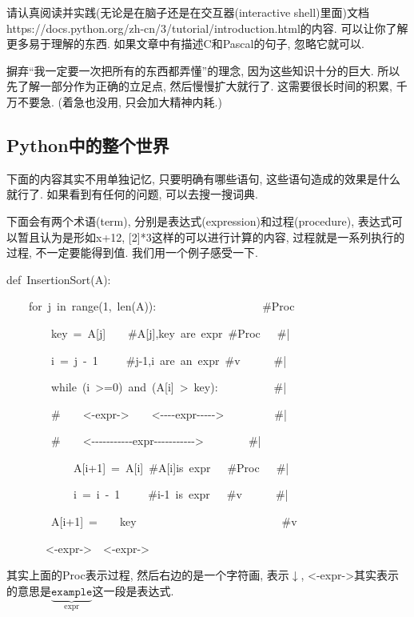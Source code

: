 请认真阅读并实践(无论是在脑子还是在交互器(interactive shell)里面)文档https://docs.python.org/zh-cn/3/tutorial/introduction.html的内容.
可以让你了解更多易于理解的东西. 如果文章中有描述C和Pascal的句子, 忽略它就可以. 

\begin{idea}
摒弃``我一定要一次把所有的东西都弄懂''的理念, 因为这些知识十分的巨大. 所以先了解一部分作为正确的立足点, 然后慢慢扩大就行了. 这需要很长时间的积累, 千万不要急. (着急也没用, 只会加大精神内耗.)	
\end{idea}

\subsection{Python中的整个世界}

下面的内容其实不用单独记忆, 只要明确有哪些语句, 这些语句造成的效果是什么就行了. 如果看到有任何的问题, 可以去搜一搜词典. 

下面会有两个术语(term), 分别是表达式(expression)和过程(procedure), 表达式可以暂且认为是形如x+12,
{[}2{]}{*}3这样的可以进行计算的内容, 过程就是一系列执行的过程, 不一定要能得到值. 我们用一个例子感受一下.

\newpage

\begin{lyxcode}
def~InsertionSort(A):~~~~~~~~~~~~~~~~~~~~~~~~~~~~

~~~~for~j~in~range(1,~len(A)):~~~~~~~~~~~~~~~~~~~\#Proc

~~~~~~~~key~=~A{[}j{]}~~~~\#A{[}j{]},key~are~expr~\#Proc~~~\#|

~~~~~~~~i~=~j~-~1~~~~~\#j-1,i~are~an~expr~\#v~~~~~~\#|

~~~~~~~~while~(i~>=0)~and~(A{[}i{]}~>~key):~~~~~~~~~~\#|~~~

~~~~~~~~\#~~~~<-expr->~~~~<-{}-{}-{}-expr-{}-{}-{}-{}->~~~~~~~~~\#|~~~

~~~~~~~~\#~~~~<-{}-{}-{}-{}-{}-{}-{}-{}-{}-{}-expr-{}-{}-{}-{}-{}-{}-{}-{}-{}-{}->~~~~~~~~\#|~~~

~~~~~~~~~~~~A{[}i+1{]}~=~A{[}i{]}~\#A{[}i{]}is~expr~~~\#Proc~~~\#|

~~~~~~~~~~~~i~=~i~-~1~~~~~\#i-1~is~expr~~~\#v~~~~~~\#|

~~~~~~~~A{[}i+1{]}~=~~~~key~~~~~~~~~~~~~~~~~~~~~~~~~~\#v

~~~~~~~<-expr->~~<-expr->
\end{lyxcode}
其实上面的Proc表示过程, 然后右边的是一个字符画, 表示$\downarrow$, <-expr->其实表示的意思是$\underbrace{\texttt{example}}_{\text{expr}}$这一段是表达式. 

